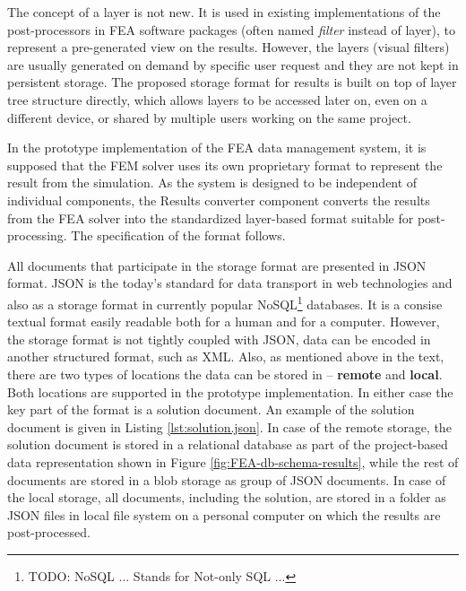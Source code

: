 The concept of a layer is not new. It is used in existing implementations of the post-processors in FEA software packages (often named \textit{filter} instead of layer), to represent a pre-generated view on the results. However, the layers (visual filters) are usually generated on demand by specific user request and they are not kept in persistent storage. The proposed storage format for results is built on top of layer tree structure directly, which allows layers to be accessed later on, even on a different device, or shared by multiple users working on the same project.

In the prototype implementation of the FEA data management system, it is supposed that the FEM solver uses its own proprietary format to represent the result from the simulation. As the system is designed to be independent of individual components, the Results converter component converts the results from the FEA solver into the standardized layer-based format suitable for post-processing. The specification of the format follows.


All documents that participate in the storage format are presented in JSON format. JSON is the today's standard for data transport in web technologies and also as a storage format in currently popular NoSQL\footnote{TODO: NoSQL ... Stands for Not-only SQL ...} databases. It is a consise textual format easily readable both for a human and for a computer. However, the storage format is not tightly coupled with JSON, data can be encoded in another structured format, such as XML. Also, as mentioned above in the text, there are two types of locations the data can be stored in -- \textbf{remote} and \textbf{local}. Both locations are supported in the prototype implementation. In either case the key part of the format is a solution document. An example of the solution document is given in Listing \ref{lst:solution.json}. In case of the remote storage, the solution document is stored in a relational database as part of the project-based data representation shown in Figure \ref{fig:FEA-db-schema-results}, while the rest of documents are stored in a blob storage as group of JSON documents. In case of the local storage, all documents, including the solution, are stored in a folder as JSON files in local file system on a personal computer on which the results are post-processed.

